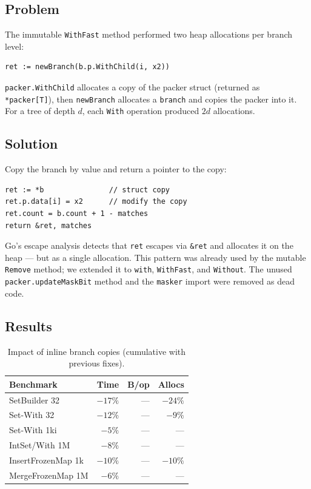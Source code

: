 \documentclass[11pt,twocolumn]{article}
\begin{document}
\subsection{Problem}

The immutable \texttt{WithFast} method performed two heap allocations per
branch level:

\begin{verbatim}
ret := newBranch(b.p.WithChild(i, x2))
\end{verbatim}

\texttt{packer.WithChild} allocates a copy of the packer struct (returned
as \texttt{*packer[T]}), then \texttt{newBranch} allocates a \texttt{branch}
and copies the packer into it.
For a tree of depth $d$, each \texttt{With} operation produced $2d$
allocations.

\subsection{Solution}

Copy the branch by value and return a pointer to the copy:

\begin{verbatim}
ret := *b               // struct copy
ret.p.data[i] = x2      // modify the copy
ret.count = b.count + 1 - matches
return &ret, matches
\end{verbatim}

Go's escape analysis detects that \texttt{ret} escapes via \texttt{\&ret}
and allocates it on the heap --- but as a single allocation.
This pattern was already used by the mutable \texttt{Remove} method; we
extended it to \texttt{with}, \texttt{WithFast}, and \texttt{Without}.
The unused \texttt{packer.updateMaskBit} method and the \texttt{masker}
import were removed as dead code.

\subsection{Results}

\begin{table}[h]
\centering
\caption{Impact of inline branch copies (cumulative with previous fixes).}
\label{tab:inline}
\begin{tabular}{@{}lrrr@{}}
\toprule
Benchmark & Time & B/op & Allocs \\
\midrule
SetBuilder 32   & $-17\%$ & --- & $-24\%$ \\
Set-With 32     & $-12\%$ & --- & $-9\%$ \\
Set-With 1ki    & $-5\%$ & --- & --- \\
IntSet/With 1M  & $-8\%$ & --- & --- \\
InsertFrozenMap 1k & $-10\%$ & --- & $-10\%$ \\
MergeFrozenMap 1M  & $-6\%$ & --- & --- \\
\bottomrule
\end{tabular}
\end{table}
\end{document}
